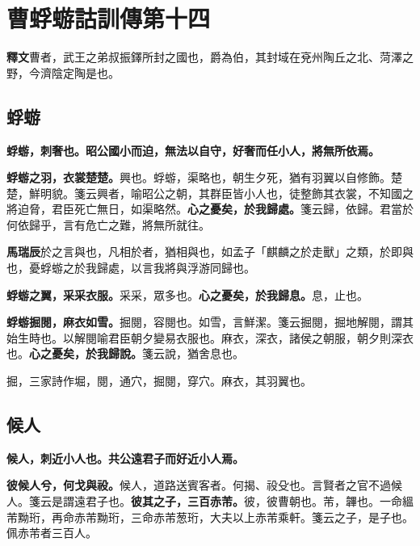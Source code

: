 \chapter{曹蜉蝣詁訓傳第十四}

\begin{quoting}\textbf{釋文}曹者，武王之弟叔振鐸所封之國也，爵為伯，其封域在兗州陶丘之北、菏澤之野，今濟陰定陶是也。\end{quoting}

\section{蜉蝣}


\textbf{蜉蝣，刺奢也。昭公國小而迫，無法以自守，好奢而任小人，將無所依焉。}

\textbf{蜉蝣之羽，衣裳楚楚。}{\footnotesize 興也。蜉蝣，渠略也，朝生夕死，猶有羽翼以自修飾。楚楚，鮮明貌。箋云興者，喻昭公之朝，其群臣皆小人也，徒整飾其衣裳，不知國之將迫脅，君臣死亡無日，如渠略然。}\textbf{心之憂矣，於我歸處。}{\footnotesize 箋云歸，依歸。君當於何依歸乎，言有危亡之難，將無所就往。}

\begin{quoting}\textbf{馬瑞辰}於之言與也，凡相於者，猶相與也，如孟子「麒麟之於走獸」之類，於即與也，憂蜉蝣之於我歸處，以言我將與浮游同歸也。\end{quoting}

\textbf{蜉蝣之翼，采采衣服。}{\footnotesize 采采，眾多也。}\textbf{心之憂矣，於我歸息。}{\footnotesize 息，止也。}

\textbf{蜉蝣掘閱，麻衣如雪。}{\footnotesize 掘閱，容閱也。如雪，言鮮潔。箋云掘閱，掘地解閱，謂其始生時也。以解閱喻君臣朝夕變易衣服也。麻衣，深衣，諸侯之朝服，朝夕則深衣也。}\textbf{心之憂矣，於我歸說。}{\footnotesize 箋云說，猶舍息也。}

\begin{quoting}掘，三家詩作堀，閱，通穴，掘閱，穿穴。麻衣，其羽翼也。\end{quoting}

\section{候人}


\textbf{候人，刺近小人也。共公遠君子而好近小人焉。}

\textbf{彼候人兮，何戈與祋。}{\footnotesize 候人，道路送賓客者。何揭、祋殳也。言賢者之官不過候人。箋云是謂遠君子也。}\textbf{彼其之子，三百赤芾。}{\footnotesize 彼，彼曹朝也。芾，韠也。一命縕芾黝珩，再命赤芾黝珩，三命赤芾葱珩，大夫以上赤芾乘軒。箋云之子，是子也。佩赤芾者三百人。}

